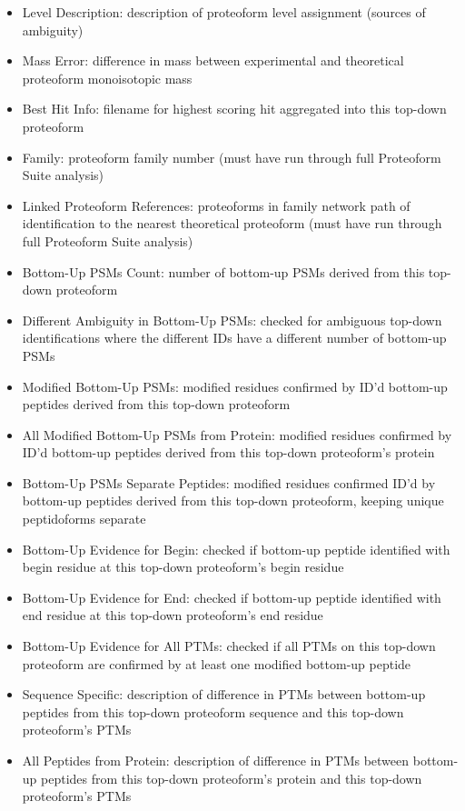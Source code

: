 \begin{itemize}
\begin{itemize}
		\item Level Description: description of proteoform level assignment (sources of ambiguity)
		\item Mass Error: difference in mass between experimental and theoretical proteoform monoisotopic mass
		\item Best Hit Info: filename for highest scoring hit aggregated into this top-down proteoform
		\item Family: proteoform family number (must have run through full Proteoform Suite analysis)
		\item Linked Proteoform References: proteoforms in family network path of identification to the nearest theoretical proteoform (must have run through full Proteoform Suite analysis)
		\item Bottom-Up PSMs Count: number of bottom-up PSMs derived from this top-down proteoform
		\item Different Ambiguity in Bottom-Up PSMs: checked for ambiguous top-down identifications where the different IDs have a different number of bottom-up PSMs
		\item Modified Bottom-Up PSMs: modified residues confirmed by ID'd bottom-up peptides derived from this top-down proteoform
		\item All Modified Bottom-Up PSMs from Protein: modified residues confirmed by ID'd bottom-up peptides derived from this top-down proteoform's protein
		\item Bottom-Up PSMs Separate Peptides: modified residues confirmed ID'd by bottom-up peptides derived from this top-down proteoform, keeping unique peptidoforms separate
		\item Bottom-Up Evidence for Begin: checked if bottom-up peptide identified with begin residue at this top-down proteoform's begin residue
		\item Bottom-Up Evidence for End: checked if bottom-up peptide identified with end residue at this top-down proteoform's end residue
		\item Bottom-Up Evidence for All PTMs: checked if all PTMs on this top-down proteoform are confirmed by at least one modified bottom-up peptide
		\item Sequence Specific: description of difference in PTMs between bottom-up peptides from this top-down proteoform sequence and this top-down proteoform's PTMs
		\item All Peptides from Protein: description of difference in PTMs between bottom-up peptides from this top-down proteoform's protein and this top-down proteoform's PTMs

\end{itemize}
\end{itemize}

